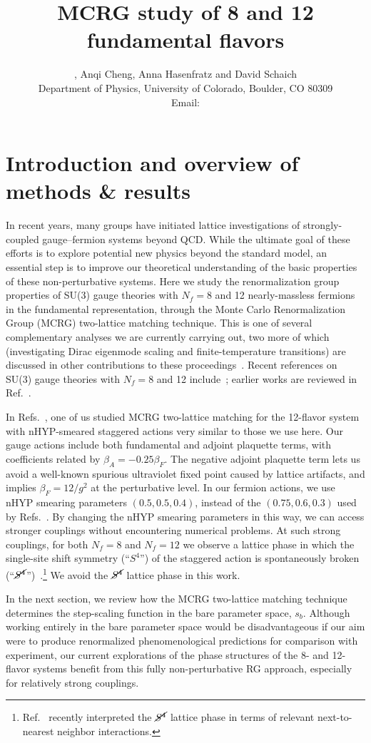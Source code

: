 \documentclass{PoS}
\title{MCRG study of 8 and 12 fundamental flavors}
\author{\speaker{Gregory Petropoulos}, Anqi Cheng, Anna Hasenfratz and David Schaich \\
  Department of Physics, University of Colorado, Boulder, CO 80309 \\
  Email: \email{gregory.petropoulos@colorado.edu}
}
\newcommand{\be}{\ensuremath{\beta} }
\newcommand{\Sb}{\ensuremath{\cancel{S^4}} }
\newcommand{\refcite}[1]{Ref.~\cite{#1}}
\begin{document}
\section{Introduction and overview of methods \& results} %
In recent years, many groups have initiated lattice investigations of strongly-coupled gauge--fermion systems beyond QCD.
While the ultimate goal of these efforts is to explore potential new physics beyond the standard model, an essential step is to improve our theoretical understanding of the basic properties of these non-perturbative systems.
Here we study the renormalization group properties of SU(3) gauge theories with $N_f = 8$ and 12 nearly-massless fermions in the fundamental representation, through the Monte Carlo Renormalization Group (MCRG) two-lattice matching technique.
This is one of several complementary analyses we are currently carrying out, two more of which (investigating Dirac eigenmode scaling and finite-temperature transitions) are discussed in other contributions to these proceedings~\cite{Hasenfratz:2012fp, Schaich:2012fr}.
Recent references on SU(3) gauge theories with $N_f = 8$ and 12 include~\cite{Fodor:2012uw, Fodor:2012et, Aoki:2012eq, Deuzeman:2012ee, Lin:2012iw}; earlier works are reviewed in \refcite{Giedt:2012LAT}.

In Refs.~\cite{Hasenfratz:2011xn, Hasenfratz:2011np}, one of us studied MCRG two-lattice matching for the 12-flavor system with nHYP-smeared staggered actions very similar to those we use here.
Our gauge actions include both fundamental and adjoint plaquette terms, with coefficients related by $\be_A = -0.25\be_F$.
The negative adjoint plaquette term lets us avoid a well-known spurious ultraviolet fixed point caused by lattice artifacts, and implies $\be_F = 12 / g^2$ at the perturbative level.
In our fermion actions, we use nHYP smearing parameters $(0.5, 0.5, 0.4)$, instead of the $(0.75, 0.6, 0.3)$ used by Refs.~\cite{Hasenfratz:2011xn, Hasenfratz:2011np}.
By changing the nHYP smearing parameters in this way, we can access stronger couplings without encountering numerical problems.
At such strong couplings, for both $N_f = 8$ and $N_f = 12$ we observe a lattice phase in which the single-site shift symmetry (``$S^4$'') of the staggered action is spontaneously broken (``$\Sb$'')~\cite{Cheng:2011ic, Schaich:2012fr}.\footnote{\refcite{Deuzeman:2012ee} recently interpreted the \Sb lattice phase in terms of relevant next-to-nearest neighbor interactions.}
We avoid the \Sb lattice phase in this work.

In the next section, we review how the MCRG two-lattice matching technique determines the step-scaling function in the bare parameter space, $s_b$.
Although working entirely in the bare parameter space would be disadvantageous if our aim were to produce renormalized phenomenological predictions for comparison with experiment, our current explorations of the phase structures of the 8- and 12-flavor systems benefit from this fully non-perturbative RG approach, especially for relatively strong couplings.
\end{document}
